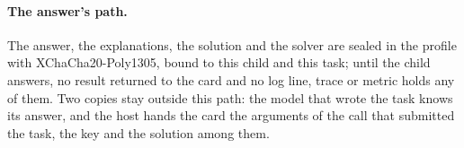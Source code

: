 \paragraph{The answer's path.} The answer, the explanations, the solution and the solver are sealed in the profile with XChaCha20-Poly1305, bound to this child and this task; until the child answers, no result returned to the card and no log line, trace or metric holds any of them. Two copies stay outside this path: the model that wrote the task knows its answer, and the host hands the card the arguments of the call that submitted the task, the key and the solution among them.
